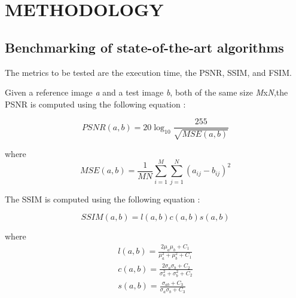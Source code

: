 
\chapter{METHODOLOGY} %

\label{Chapter4} %



\section{Benchmarking of state-of-the-art algorithms}

The metrics to be tested are the execution time, the PSNR, SSIM, and FSIM.

Given a reference image \textit{a} and a test image \textit{b}, both of the same size \textit{M}x\textit{N},the PSNR is computed using the following equation \citep{Hore2010}:

\begin{equation}
PSNR(a,b) = 20 \log_{10}\frac{255}{\sqrt{MSE(a,b)}}
\end{equation}

where
\begin{equation}
MSE(a,b) = \frac{1}{MN} \sum\limits_{i=1}^{M} \sum\limits_{j=1}^{N} (a_{ij}-b_{ij})^2
\end{equation}

The SSIM is computed using the following equation \citep{Hore2010}:

\begin{equation}
SSIM(a,b) = l(a,b) c(a,b) s(a,b)
\end{equation}

where
\begin{eqnarray}
l(a,b) = \frac{2\mu_a\mu_b+C_1}{\mu_a^2+\mu_b^2+C_1} \label{eqn:luminance_ssim}\\
c(a,b) = \frac{2\sigma_a\sigma_b+C_2}{\sigma_a^2+\sigma_b^2+C_2}\label{eqn:contrast_ssim}\\
s(a,b) = \frac{\sigma_{ab}+C_3}{\sigma_a\sigma_b+C_3}\label{eqn:structure_ssim}
\end{eqnarray}

